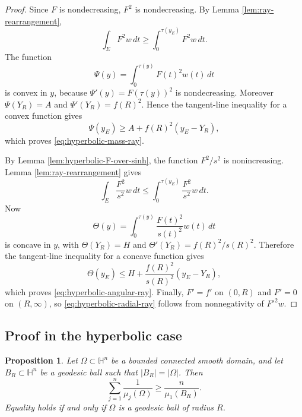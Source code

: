 \documentclass[11pt]{amsart}
\newtheorem{proposition}[theorem]{Proposition}
\theoremstyle{remark}
\newcommand{\HH}{\mathbb H}
\begin{document}
\begin{proof}
Since $F$ is nondecreasing, $F^2$ is nondecreasing.  By Lemma \ref{lem:ray-rearrangement},
$$
        \int_EF^2w\,dt\ge \int_0^{\tau(y_E)}F^2w\,dt.
$$
The function
$$
        \Psi(y)=\int_0^{\tau(y)}F(t)^2w(t)\,dt
$$
is convex in $y$, because $\Psi'(y)=F(\tau(y))^2$ is nondecreasing.  Moreover $\Psi(Y_R)=A$ and $\Psi'(Y_R)=f(R)^2$.  Hence the tangent-line inequality for a convex function gives
$$
        \Psi(y_E)\ge A+f(R)^2(y_E-Y_R),
$$
which proves \eqref{eq:hyperbolic-mass-ray}.

By Lemma \ref{lem:hyperbolic-F-over-sinh}, the function $F^2/s^2$ is nonincreasing.  Lemma \ref{lem:ray-rearrangement} gives
$$
        \int_E\frac{F^2}{s^2}w\,dt
        \le \int_0^{\tau(y_E)}\frac{F^2}{s^2}w\,dt.
$$
Now
$$
        \Theta(y)=\int_0^{\tau(y)}\frac{F(t)^2}{s(t)^2}w(t)\,dt
$$
is concave in $y$, with $\Theta(Y_R)=H$ and $\Theta'(Y_R)=f(R)^2/s(R)^2$.  Therefore the tangent-line inequality for a concave function gives
$$
        \Theta(y_E)\le H+\frac{f(R)^2}{s(R)^2}(y_E-Y_R),
$$
which proves \eqref{eq:hyperbolic-angular-ray}.  Finally, $F'=f'$ on $(0,R)$ and $F'=0$ on $(R,\infty)$, so \eqref{eq:hyperbolic-radial-ray} follows from nonnegativity of $F'^2w$.
\end{proof}

\subsection{Proof in the hyperbolic case}

\begin{proposition}\label{prop:hyperbolic}
Let $\Omega\subset\HH^n$ be a bounded connected smooth domain, and let $B_R\subset\HH^n$ be a geodesic ball such that $|B_R|=|\Omega|$.  Then
\begin{equation}\label{eq:hyperbolic-conclusion}
        \sum_{j=1}^n\frac1{\mu_j(\Omega)}
        \ge
        \frac{n}{\mu_1(B_R)}.
\end{equation}
Equality holds if and only if $\Omega$ is a geodesic ball of radius $R$.
\end{proposition}
\end{document}

